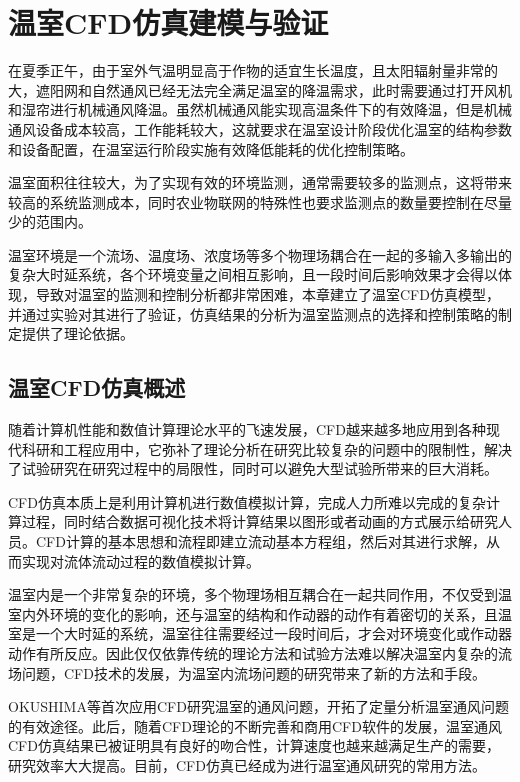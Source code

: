 

\chapter{温室CFD仿真建模与验证}
\label{chapter:CFD}
在夏季正午，由于室外气温明显高于作物的适宜生长温度，且太阳辐射量非常的大，遮阳网和自然通风已经无法完全满足温室的降温需求，此时需要通过打开风机和湿帘进行机械通风降温。虽然机械通风能实现高温条件下的有效降温，但是机械通风设备成本较高，工作能耗较大，这就要求在温室设计阶段优化温室的结构参数和设备配置，在温室运行阶段实施有效降低能耗的优化控制策略。

温室面积往往较大，为了实现有效的环境监测，通常需要较多的监测点，这将带来较高的系统监测成本，同时农业物联网的特殊性也要求监测点的数量要控制在尽量少的范围内。

温室环境是一个流场、温度场、浓度场等多个物理场耦合在一起的多输入多输出的复杂大时延系统，各个环境变量之间相互影响，且一段时间后影响效果才会得以体现，导致对温室的监测和控制分析都非常困难，本章建立了温室CFD仿真模型，并通过实验对其进行了验证，仿真结果的分析为温室监测点的选择和控制策略的制定提供了理论依据。

\section{温室CFD仿真概述}
随着计算机性能和数值计算理论水平的飞速发展，CFD越来越多地应用到各种现代科研和工程应用中，它弥补了理论分析在研究比较复杂的问题中的限制性，解决了试验研究在研究过程中的局限性，同时可以避免大型试验所带来的巨大消耗。

CFD仿真本质上是利用计算机进行数值模拟计算，完成人力所难以完成的复杂计算过程，同时结合数据可视化技术将计算结果以图形或者动画的方式展示给研究人员。CFD计算的基本思想和流程即建立流动基本方程组，然后对其进行求解，从而实现对流体流动过程的数值模拟计算。

温室内是一个非常复杂的环境，多个物理场相互耦合在一起共同作用，不仅受到温室内外环境的变化的影响，还与温室的结构和作动器的动作有着密切的关系，且温室是一个大时延的系统，温室往往需要经过一段时间后，才会对环境变化或作动器动作有所反应。因此仅仅依靠传统的理论方法和试验方法难以解决温室内复杂的流场问题，CFD技术的发展，为温室内流场问题的研究带来了新的方法和手段。

OKUSHIMA等首次应用CFD研究温室的通风问题，开拓了定量分析温室通风问题的有效途径。此后，随着CFD理论的不断完善和商用CFD软件的发展，温室通风CFD仿真结果已被证明具有良好的吻合性，计算速度也越来越满足生产的需要，研究效率大大提高。目前，CFD仿真已经成为进行温室通风研究的常用方法。


